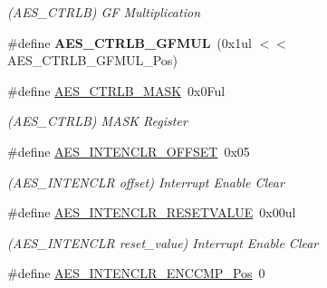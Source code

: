 \begin{DoxyCompactItemize}
\begin{DoxyCompactList}\small\item\em (A\+E\+S\+\_\+\+C\+T\+R\+L\+B) G\+F Multiplication \end{DoxyCompactList}\item 
\hypertarget{group___s_a_m_l21___a_e_s_ga8aeb19745f0d7baffe861584a4753db5}{}\#define {\bfseries A\+E\+S\+\_\+\+C\+T\+R\+L\+B\+\_\+\+G\+F\+M\+U\+L}~(0x1ul $<$$<$ A\+E\+S\+\_\+\+C\+T\+R\+L\+B\+\_\+\+G\+F\+M\+U\+L\+\_\+\+Pos)\label{group___s_a_m_l21___a_e_s_ga8aeb19745f0d7baffe861584a4753db5}

\item 
\hypertarget{group___s_a_m_l21___a_e_s_ga405604e13781e19236f362bbbbebfd57}{}\#define \hyperlink{group___s_a_m_l21___a_e_s_ga405604e13781e19236f362bbbbebfd57}{A\+E\+S\+\_\+\+C\+T\+R\+L\+B\+\_\+\+M\+A\+S\+K}~0x0\+Ful\label{group___s_a_m_l21___a_e_s_ga405604e13781e19236f362bbbbebfd57}

\begin{DoxyCompactList}\small\item\em (A\+E\+S\+\_\+\+C\+T\+R\+L\+B) M\+A\+S\+K Register \end{DoxyCompactList}\item 
\hypertarget{group___s_a_m_l21___a_e_s_ga64c9898fc7d9f702e0c1b3764fd70c28}{}\#define \hyperlink{group___s_a_m_l21___a_e_s_ga64c9898fc7d9f702e0c1b3764fd70c28}{A\+E\+S\+\_\+\+I\+N\+T\+E\+N\+C\+L\+R\+\_\+\+O\+F\+F\+S\+E\+T}~0x05\label{group___s_a_m_l21___a_e_s_ga64c9898fc7d9f702e0c1b3764fd70c28}

\begin{DoxyCompactList}\small\item\em (A\+E\+S\+\_\+\+I\+N\+T\+E\+N\+C\+L\+R offset) Interrupt Enable Clear \end{DoxyCompactList}\item 
\hypertarget{group___s_a_m_l21___a_e_s_gaa9b0902c4985f9ed2a378655d8e9af06}{}\#define \hyperlink{group___s_a_m_l21___a_e_s_gaa9b0902c4985f9ed2a378655d8e9af06}{A\+E\+S\+\_\+\+I\+N\+T\+E\+N\+C\+L\+R\+\_\+\+R\+E\+S\+E\+T\+V\+A\+L\+U\+E}~0x00ul\label{group___s_a_m_l21___a_e_s_gaa9b0902c4985f9ed2a378655d8e9af06}

\begin{DoxyCompactList}\small\item\em (A\+E\+S\+\_\+\+I\+N\+T\+E\+N\+C\+L\+R reset\+\_\+value) Interrupt Enable Clear \end{DoxyCompactList}\item 
\hypertarget{group___s_a_m_l21___a_e_s_ga9f0b2df1c42584d5ac86a900ad27543a}{}\#define \hyperlink{group___s_a_m_l21___a_e_s_ga9f0b2df1c42584d5ac86a900ad27543a}{A\+E\+S\+\_\+\+I\+N\+T\+E\+N\+C\+L\+R\+\_\+\+E\+N\+C\+C\+M\+P\+\_\+\+Pos}~0\label{group___s_a_m_l21___a_e_s_ga9f0b2df1c42584d5ac86a900ad27543a}


\end{DoxyCompactItemize}
